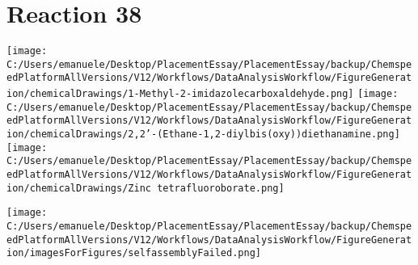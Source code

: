 \documentclass{article}%
\begin{document}
\section*{Reaction 38}%
%
\begin{scheme}[H]%
\begin{minipage}{0.5\textwidth}%
\texttt{[image: C:/Users/emanuele/Desktop/PlacementEssay/PlacementEssay/backup/ChemspeedPlatformAllVersions/V12/Workflows/DataAnalysisWorkflow/FigureGeneration/chemicalDrawings/1-Methyl-2-imidazolecarboxaldehyde.png]}%
\texttt{[image: C:/Users/emanuele/Desktop/PlacementEssay/PlacementEssay/backup/ChemspeedPlatformAllVersions/V12/Workflows/DataAnalysisWorkflow/FigureGeneration/chemicalDrawings/2,2'-(Ethane-1,2-diylbis(oxy))diethanamine.png]}%
\texttt{[image: C:/Users/emanuele/Desktop/PlacementEssay/PlacementEssay/backup/ChemspeedPlatformAllVersions/V12/Workflows/DataAnalysisWorkflow/FigureGeneration/chemicalDrawings/Zinc tetrafluoroborate.png]}%
\end{minipage}%
\begin{minipage}{0.5\textwidth}%
\begin{center}%
\texttt{[image: C:/Users/emanuele/Desktop/PlacementEssay/PlacementEssay/backup/ChemspeedPlatformAllVersions/V12/Workflows/DataAnalysisWorkflow/FigureGeneration/imagesForFigures/selfassemblyFailed.png]}%
\end{center}%
\end{minipage}%
\caption{Self-assembly of components 12, 19, with Zinc(II) in a 3.0:1.5:1.0 molar ratio in CH$_3$CN at 60\textdegree C for 40h. These are the reagents (starting materials) for reaction 38.}%
\end{scheme}%
\end{document}
